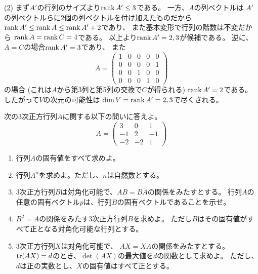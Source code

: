 \documentclass[report]{jlreq}
\begin{document}
\begin{answer}
    \uline{(2)} \quad
    まず$A'$の行列のサイズより$\operatorname{rank} A' \le 3$である。
    一方、$A$の列ベクトルは
    $A'$の列ベクトルらに2個の列ベクトルを付け加えたものだから
    $\operatorname{rank} A' \le \operatorname{rank} A \le \operatorname{rank} A' + 2$であり、
    また基本変形で行列の階数は不変だから
    $\operatorname{rank} A = \operatorname{rank} C = 4$である。
    以上より$\operatorname{rank} A' = 2, 3$が候補である。
    逆に、
    $A = C$の場合$\operatorname{rank} A' = 3$であり、
    また
    \begin{equation}
        A = \begin{pmatrix}
            1 & 0 & 0 & 0 & 0 \\
            0 & 0 & 0 & 0 & 1 \\
            0 & 0 & 1 & 0 & 0 \\
            0 & 0 & 0 & 1 & 0
        \end{pmatrix}
    \end{equation}
    の場合
    (これは$A$から第3列と第5列の交換で$C$が得られる)
    $\operatorname{rank} A' = 2$である。
    したがって$V$の次元の可能性は
    $\dim V = \operatorname{rank} A' = 2, 3$で尽くされる。
\end{answer}

\begin{problem}[物理工学科]
    次の3次正方行列$A$に関する以下の問いに答えよ。
    \begin{equation}
        A = \begin{pmatrix}
            3 & 0 & 1 \\
            -1 & 2 & -1 \\
            -2 & -2 & 1
        \end{pmatrix}
    \end{equation}
    \begin{enumerate}
        \item 行列$A$の固有値をすべて求めよ。
        \item 行列$A^n$を求めよ。ただし、$n$は自然数とする。
        \item 3次正方行列$B$は対角化可能で、$AB = BA$の関係をみたすとする。
            行列$A$の任意の固有ベクトル$p$は、行列$B$の固有ベクトルであることを示せ。
        \item $B^2 = A$の関係をみたす3次正方行列$B$を求めよ。
            ただし$B$はその固有値がすべて正となる対角化可能な行列とする。
        \item 3次正方行列$X$は対角化可能で、
            $AX = XA$の関係をみたすとする。
            $\operatorname{tr}(AX) = d$のとき、$\det(AX)$の最大値を$d$の関数として求めよ。
            ただし、$d$は正の実数とし、$X$の固有値はすべて正とする。
    \end{enumerate}
\end{problem}
\end{document}
